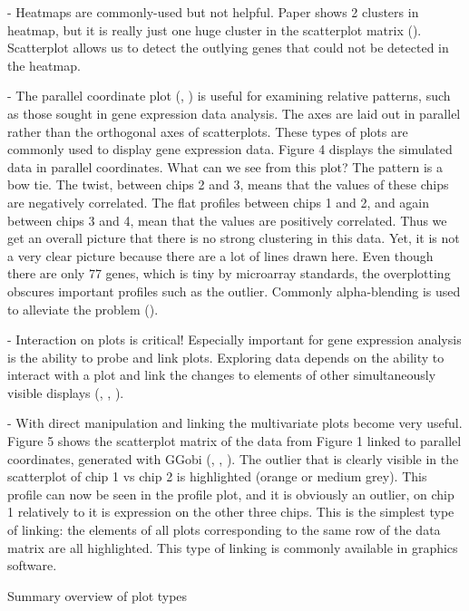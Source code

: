 \documentclass[11pt,a4paper,oldfontcommands,openany]{memoir}
\numberwithin{equation}{section} %
\begin{document}
- Heatmaps are commonly-used but not helpful. Paper shows 2 clusters in heatmap, but it is really just one huge cluster in the scatterplot matrix (\citealt{jds}). Scatterplot allows us to detect the outlying genes that could not be detected in the heatmap.

- The parallel coordinate plot (\citealt{origPCP}, \citealt{origPCP2}) is useful for examining relative patterns, such as those sought in gene expression data analysis. The axes are laid out in parallel rather than the orthogonal axes of scatterplots. These types of plots are commonly used to display gene expression data. Figure 4 displays the simulated data in parallel coordinates. What can we see from this plot? The pattern is a bow tie. The twist, between chips 2 and 3, means that the values of these chips are negatively correlated. The flat profiles between chips 1 and 2, and again between chips 3 and 4, mean that the values are positively correlated. Thus we get an overall picture that there is no strong clustering in this data. Yet, it is not a very clear picture because there are a lot of lines drawn here. Even though there are only 77 genes, which is tiny by microarray standards, the overplotting obscures important profiles such as the outlier. Commonly alpha-blending is used to alleviate the problem (\citealt{jds}).

- Interaction on plots is critical! Especially important for gene expression analysis is the ability to probe and link plots. Exploring data depends on the ability to interact with a plot and link the changes to elements of other simultaneously visible displays (\citealt{interact}, \citealt{interact2}, \citealt{interact3}).

- With direct manipulation and linking the multivariate plots become very useful. Figure 5 shows the scatterplot matrix of the data from Figure 1 linked to parallel coordinates, generated with GGobi (\citealt{ggobi}, \citealt{ggobi2}, \citealt{ggobi3}). The outlier that is clearly visible in the scatterplot of chip 1 vs chip 2 is highlighted (orange or medium grey). This profile can now be seen in the profile plot, and it is obviously an outlier, on chip 1 relatively to it is expression on the other three chips. This is the simplest type of linking: the elements of all plots corresponding to the same row of the data matrix are all highlighted. This type of linking is commonly available in graphics software.

Summary overview of plot types
\end{document}
